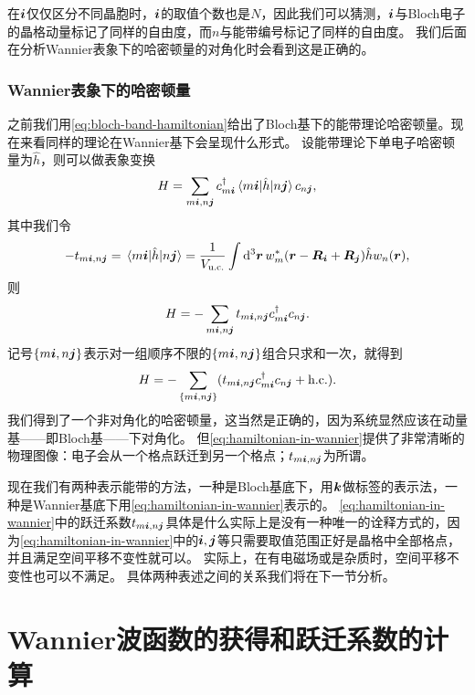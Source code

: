 在$\vb*{i}$仅仅区分不同晶胞时，$\vb*{i}$的取值个数也是$N$，因此我们可以猜测，$\vb*{i}$与Bloch电子的晶格动量标记了同样的自由度，而$n$与能带编号标记了同样的自由度。
我们后面在分析Wannier表象下的哈密顿量的对角化时会看到这是正确的。

\subsubsection{Wannier表象下的哈密顿量}

之前我们用\eqref{eq:bloch-band-hamiltonian}给出了Bloch基下的能带理论哈密顿量。现在来看同样的理论在Wannier基下会呈现什么形式。
设能带理论下单电子哈密顿量为$\hat{h}$，则可以做表象变换
\[
    {H} = \sum_{m\vb*{i}, n\vb*{j}} {c}^\dagger_{m\vb*{i}} \mel{m\vb*{i}}{\hat{h}}{n\vb*{j}} {c}_{n\vb*{j}},
\]
其中我们令
\begin{equation}
    - t_{m\vb*{i}, n\vb*{j}} = \mel{m\vb*{i}}{\hat{h}}{n\vb*{j}} = \frac{1}{V_\text{u.c.}} \int \dd[3]{\vb*{r}} w_m^*(\vb*{r} - \vb*{R}_{\vb*{i}} + \vb*{R}_{\vb*{j}}) \hat{h} w_n(\vb*{r}),
    \label{eq:wannier-hopping-term}
\end{equation}
则
\[
    {H} = - \sum_{m\vb*{i}, n\vb*{j}} t_{m\vb*{i}, n\vb*{j}} {c}^\dagger_{m\vb*{i}} {c}_{n\vb*{j}}.
\]
记号$\{m\vb*{i}, n\vb*{j}\}$表示对一组顺序不限的$\{m\vb*{i}, n\vb*{j}\}$组合只求和一次，就得到
\begin{equation}
    {H} = - \sum_{\{m\vb*{i}, n\vb*{j}\}} (t_{m\vb*{i}, n\vb*{j}} {c}_{m\vb*{i}}^\dagger {c}_{n\vb*{j}} + \text{h.c.}).
    \label{eq:hamiltonian-in-wannier}
\end{equation}
我们得到了一个非对角化的哈密顿量，这当然是正确的，因为系统显然应该在动量基——即Bloch基——下对角化。
但\eqref{eq:hamiltonian-in-wannier}提供了非常清晰的物理图像：电子会从一个格点跃迁到另一个格点；$t_{m\vb*{i}, n\vb*{j}}$为所谓。

现在我们有两种表示能带的方法，一种是Bloch基底下，用$\vb*{k}$做标签的表示法，一种是Wannier基底下用\eqref{eq:hamiltonian-in-wannier}表示的。
\eqref{eq:hamiltonian-in-wannier}中的跃迁系数$t_{m\vb*{i}, n\vb*{j}}$具体是什么实际上是没有一种唯一的诠释方式的，因为\eqref{eq:hamiltonian-in-wannier}中的$\vb*{i}, \vb*{j}$等只需要取值范围正好是晶格中全部格点，并且满足空间平移不变性就可以。
实际上，在有电磁场或是杂质时，空间平移不变性也可以不满足。
具体两种表述之间的关系我们将在下一节分析。

\section{Wannier波函数的获得和跃迁系数的计算}

